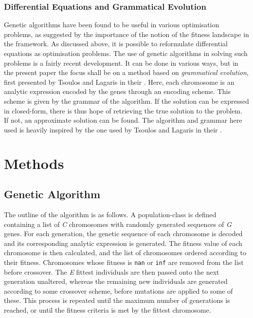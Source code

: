 \documentclass[multicolumn, 12pt]{extarticle}
\begin{document}
\subsubsection{Differential Equations and Grammatical Evolution}
Genetic algorithms have been found to be useful in various optimisation problems, as suggested by the importance of the notion of the fitness landscape in the framework. As discussed above, it is possible to reformulate differential equations as optimisation problems. The use of genetic algorithms in solving such problems is a fairly recent development. It can be done in various ways, but in the present paper the focus shall be on a method based on \textit{grammatical evolution}, first presented by Tsoulos and Lagaris in their  \cite{Lagaris}. Here, each chromosome is an analytic expression encoded by the genes through an encoding scheme. This scheme is given by the grammar of the algorithm. If the solution can be expressed in closed-form, there is thus hope of retrieving the true solution to the problem. If not, an approximate solution can be found. The algorithm and grammar here used is heavily inspired by the one used by Tsoulos and Lagaris in their  \cite{Lagaris}. 



\section{Methods}

\subsection{Genetic Algorithm}
The outline of the algorithm is as follows. A population-class is defined containing a list of \textit{C} chromosomes with randomly generated sequences of \textit{G} genes. For each generation, the genetic sequence of each chromosome is decoded and its corresponding analytic expression is generated. The fitness value of each chromosome is then calculated, and the list of chromosomes ordered according to their fitness. Chromosomes whose fitness is \texttt{nan} or \texttt{inf} are removed from the list before crossover. The \textit{E} fittest individuals are then passed onto the next generation unaltered, whereas the remaining new individuals are generated according to some crossover scheme, before mutations are applied to some of these.  This process is repeated until the maximum number of generations is reached, or until the fitness criteria is met by the fittest chromosome. 
\end{document}
